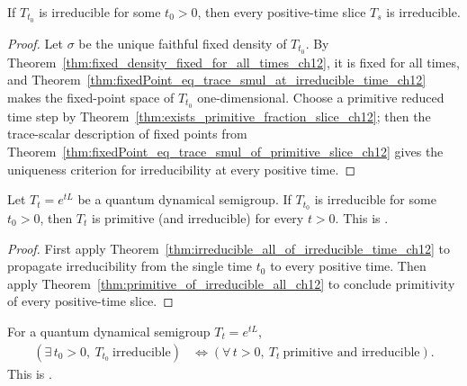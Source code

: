 \begin{theorem}
    \label{thm:irreducible_all_of_irreducible_time_ch12}
    \leanok
    If $T_{t_0}$ is irreducible for some $t_0>0$, then every positive-time slice $T_s$ is
    irreducible.
\end{theorem}

\begin{proof}
    \leanok
    Let $\sigma$ be the unique faithful fixed density of $T_{t_0}$. By
    Theorem~\ref{thm:fixed_density_fixed_for_all_times_ch12}, it is fixed for all times, and
    Theorem~\ref{thm:fixedPoint_eq_trace_smul_at_irreducible_time_ch12} makes the fixed-point
    space of $T_{t_0}$ one-dimensional. Choose a primitive reduced time step by
    Theorem~\ref{thm:exists_primitive_fraction_slice_ch12}; then the trace-scalar description
    of fixed points from Theorem~\ref{thm:fixedPoint_eq_trace_smul_of_primitive_slice_ch12}
    gives the uniqueness criterion for irreducibility at every positive time.
\end{proof}

\begin{theorem}
    \label{thm:irreducible_semigroup_implies_primitive}
    \leanok
    Let $T_t=e^{tL}$ be a quantum dynamical semigroup.
    If $T_{t_0}$ is irreducible for some $t_0>0$, then
    $T_t$ is primitive (and irreducible) for every $t>0$.
    This is \cite[Proposition~7.5]{Wolf2012Quantum}.
\end{theorem}

\begin{proof}\leanok
    First apply Theorem~\ref{thm:irreducible_all_of_irreducible_time_ch12} to propagate
    irreducibility from the single time $t_0$ to every positive time. Then apply
    Theorem~\ref{thm:primitive_of_irreducible_all_ch12} to conclude primitivity of every
    positive-time slice.
\end{proof}

\begin{theorem}
    \label{thm:qds_irreducible_iff_primitive}
    \leanok
    For a quantum dynamical semigroup $T_t=e^{tL}$,
    \begin{align}
        (\exists\, t_0>0,\ T_{t_0}\ \text{irreducible})
        &\iff
        (\forall\, t>0,\ T_t\ \text{primitive and irreducible}).
        \label{eq:semigroup_qds_equiv}
    \end{align}
    This is \cite[Proposition~7.5]{Wolf2012Quantum}.
\end{theorem}

